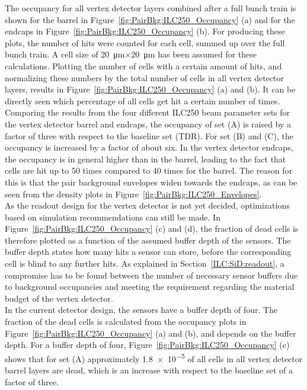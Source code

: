 The occupancy for all vertex detector layers combined after a full bunch train is shown for the barrel in Figure~\ref{fig:PairBkg:ILC250_Occupancy} (a) and for the endcaps in Figure~\ref{fig:PairBkg:ILC250_Occupancy} (b).
For producing these plots, the number of hits were counted for each cell, summed up over the full bunch train.
A cell size of \SI{20}{\micro\meter}$\times$\SI{20}{\micro\meter} has been assumed for these calculations.
Plotting the number of cells with a certain amount of hits, and normalizing these numbers by the total number of cells in all vertex detector layers, results in Figure~\ref{fig:PairBkg:ILC250_Occupancy} (a) and (b).
It can be directly seen which percentage of all cells get hit a certain number of times.
Comparing the results from the four different ILC250 beam parameter sets for the vertex detector barrel and endcaps, the occupancy of set (A) is raised by a factor of three with respect to the baseline set (TDR).
For set (B) and (C), the occupancy is increased by a factor of about six.
In the vertex detector endcaps, the occupancy is in general higher than in the barrel, leading to the fact that cells are hit up to 50 times compared to 40 times for the barrel.
The reason for this is that the pair background envelopes widen towards the endcaps, as can be seen from the density plots in Figure~\ref{fig:PairBkg:ILC250_Envelopes}.
\\As the readout design for the vertex detector is not yet decided, optimizations based on simulation recommendations can still be made.
In Figure~\ref{fig:PairBkg:ILC250_Occupancy} (c) and (d), the fraction of dead cells is therefore plotted as a function of the assumed buffer depth of the sensors.
The buffer depth states how many hits a sensor can store, before the corresponding cell is blind to any further hits.
As explained in Section~\ref{ILC:SiD:readout}, a compromise has to be found between the number of necessary sensor buffers due to background occupancies and meeting the \sid requirement regarding the material budget of the vertex detector.
\\In the current detector design, the sensors have a buffer depth of four. 
The fraction of the dead cells is calculated from the occupancy plots in Figure~\ref{fig:PairBkg:ILC250_Occupancy} (a) and (b), and depends on the buffer depth.
For a buffer depth of four, Figure~\ref{fig:PairBkg:ILC250_Occupancy} (c) shows that for set (A) approximately \num{1.8e-5} of all cells in all vertex detector barrel layers are dead, which is an increase with respect to the baseline set of a factor of three.
